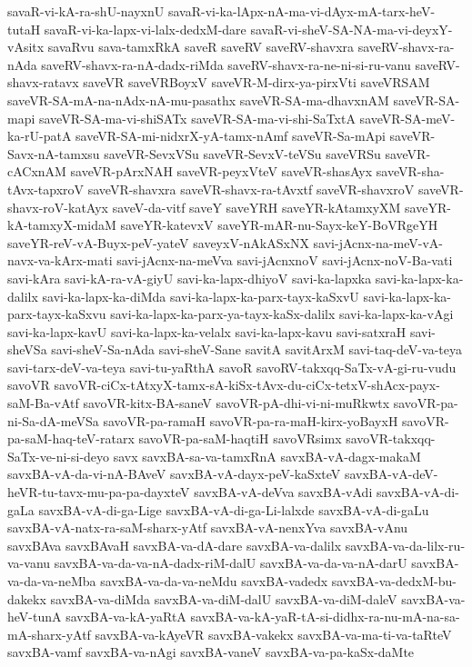 {savaR-vi-kA-ra-shU-nayxnU
savaR-vi-ka-lApx-nA-ma-vi-dAyx-mA-tarx-heV-tutaH
savaR-vi-ka-lapx-vi-lalx-dedxM-dare
savaR-vi-sheV-SA-NA-ma-vi-deyxY-vAsitx
savaRvu
sava-tamxRkA
saveR
saveRV
saveRV-shavxra
saveRV-shavx-ra-nAda
saveRV-shavx-ra-nA-dadx-riMda
saveRV-shavx-ra-ne-ni-si-ru-vanu
saveRV-shavx-ratavx
saveVR
saveVRBoyxV
saveVR-M-dirx-ya-pirxVti
saveVRSAM
saveVR-SA-mA-na-nAdx-nA-mu-pasathx
saveVR-SA-ma-dhavxnAM
saveVR-SA-mapi
saveVR-SA-ma-vi-shiSATx
saveVR-SA-ma-vi-shi-SaTxtA
saveVR-SA-meV-ka-rU-patA
saveVR-SA-mi-nidxrX-yA-tamx-nAmf
saveVR-Sa-mApi
saveVR-Savx-nA-tamxsu
saveVR-SevxVSu
saveVR-SevxV-teVSu
saveVRSu
saveVR-cACxnAM
saveVR-pArxNAH
saveVR-peyxVteV
saveVR-shasAyx
saveVR-sha-tAvx-tapxroV
saveVR-shavxra
saveVR-shavx-ra-tAvxtf
saveVR-shavxroV
saveVR-shavx-roV-katAyx
saveV-da-vitf
saveY
saveYRH
saveYR-kAtamxyXM
saveYR-kA-tamxyX-midaM
saveYR-katevxV
saveYR-mAR-nu-Sayx-keY-BoVRgeYH
saveYR-reV-vA-Buyx-peV-yateV
saveyxV-nAkASxNX
savi-jAcnx-na-meV-vA-navx-va-kArx-mati
savi-jAcnx-na-meVva
savi-jAcnxnoV
savi-jAcnx-noV-Ba-vati
savi-kAra
savi-kA-ra-vA-giyU
savi-ka-lapx-dhiyoV
savi-ka-lapxka
savi-ka-lapx-ka-dalilx
savi-ka-lapx-ka-diMda
savi-ka-lapx-ka-parx-tayx-kaSxvU
savi-ka-lapx-ka-parx-tayx-kaSxvu
savi-ka-lapx-ka-parx-ya-tayx-kaSx-dalilx
savi-ka-lapx-ka-vAgi
savi-ka-lapx-kavU
savi-ka-lapx-ka-velalx
savi-ka-lapx-kavu
savi-satxraH
savi-sheVSa
savi-sheV-Sa-nAda
savi-sheV-Sane
savitA
savitArxM
savi-taq-deV-va-teya
savi-tarx-deV-va-teya
savi-tu-yaRthA
savoR
savoRV-takxqq-SaTx-vA-gi-ru-vudu
savoVR
savoVR-ciCx-tAtxyX-tamx-sA-kiSx-tAvx-du-ciCx-tetxV-shAcx-payx-saM-Ba-vAtf
savoVR-kitx-BA-saneV
savoVR-pA-dhi-vi-ni-muRkwtx
savoVR-pa-ni-Sa-dA-meVSa
savoVR-pa-ramaH
savoVR-pa-ra-maH-kirx-yoBayxH
savoVR-pa-saM-haq-teV-ratarx
savoVR-pa-saM-haqtiH
savoVRsimx
savoVR-takxqq-SaTx-ve-ni-si-deyo
savx
savxBA-sa-va-tamxRnA
savxBA-vA-dagx-makaM
savxBA-vA-da-vi-nA-BAveV
savxBA-vA-dayx-peV-kaSxteV
savxBA-vA-deV-heVR-tu-tavx-mu-pa-pa-dayxteV
savxBA-vA-deVva
savxBA-vAdi
savxBA-vA-di-gaLa
savxBA-vA-di-ga-Lige
savxBA-vA-di-ga-Li-lalxde
savxBA-vA-di-gaLu
savxBA-vA-natx-ra-saM-sharx-yAtf
savxBA-vA-nenxYva
savxBA-vAnu
savxBAva
savxBAvaH
savxBA-va-dA-dare
savxBA-va-dalilx
savxBA-va-da-lilx-ru-va-vanu
savxBA-va-da-va-nA-dadx-riM-dalU
savxBA-va-da-va-nA-darU
savxBA-va-da-va-neMba
savxBA-va-da-va-neMdu
savxBA-vadedx
savxBA-va-dedxM-bu-dakekx
savxBA-va-diMda
savxBA-va-diM-dalU
savxBA-va-diM-daleV
savxBA-va-heV-tunA
savxBA-va-kA-yaRtA
savxBA-va-kA-yaR-tA-si-didhx-ra-nu-mA-na-sa-mA-sharx-yAtf
savxBA-va-kAyeVR
savxBA-vakekx
savxBA-va-ma-ti-va-taRteV
savxBA-vamf
savxBA-va-nAgi
savxBA-vaneV
savxBA-va-pa-kaSx-daMte
}
